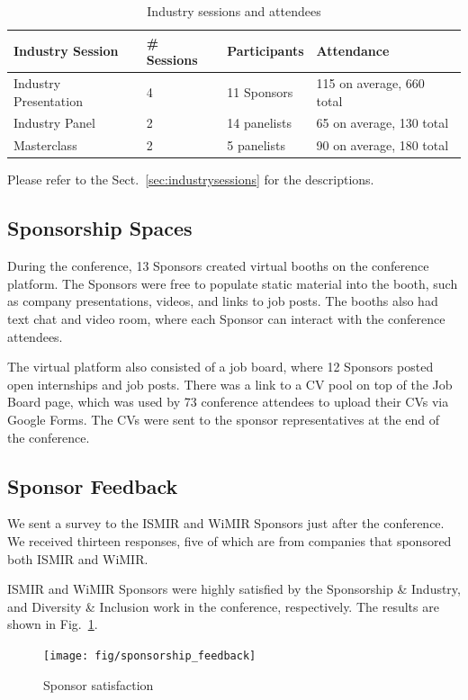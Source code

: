 \documentclass[%
10pt,								%
titlepage,						%
]
{scrartcl}
\begin{document}
        
        \begin{table}[b]
            \centering
            \begin{tabular}{l|l|l|l}
                \textbf{Industry Session} & \textbf{\# Sessions} & \textbf{Participants} & \textbf{Attendance}\\ \hline
                
                Industry Presentation & 4 & 11 Sponsors & 115 on average, 660 total\\
                Industry Panel & 2 & 14 panelists & 65 on average, 130 total\\
                Masterclass & 2 & 5 panelists & 90 on average, 180 total\\
            
            \end{tabular}
            \caption{Industry sessions and attendees}
            \label{tab:IndustrySessions}
        \end{table}
        Please refer to the Sect.~\ref{sec:industrysessions} for the descriptions.
        
    \subsection{Sponsorship Spaces}
        During the conference, 13 Sponsors created virtual booths on the conference platform. The Sponsors were free to populate static material into the booth, such as company presentations, videos, and links to job posts. The booths also had text chat and video room, where each Sponsor can interact with the conference attendees.

        The virtual platform also consisted of a job board, where 12 Sponsors posted open internships and job posts. There was a link to a CV pool on top of the Job Board page, which was used by 73 conference attendees to upload their CVs via Google Forms. The CVs were sent to the sponsor representatives at the end of the conference. 
        
    \subsection{Sponsor Feedback}   
        We sent a survey to the ISMIR and WiMIR Sponsors just after the conference. We received thirteen responses, five of which are from companies that sponsored both ISMIR and WiMIR. 

        ISMIR and WiMIR Sponsors were highly satisfied by the Sponsorship \& Industry, and Diversity \& Inclusion work in the conference, respectively. The results are shown in Fig.~\ref{fig:sponsorship_feedback}.
        \begin{figure}%
        \centering
            \texttt{[image: fig/sponsorship\_feedback]}%
            \caption{Sponsor satisfaction}%
            \label{fig:sponsorship_feedback}%
        \end{figure}
        
\end{document}
